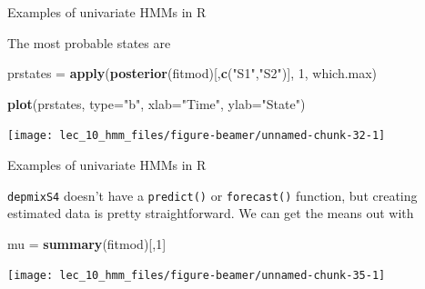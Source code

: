 \documentclass[
  ignorenonframetext,
]{beamer}
\newenvironment{Shaded}{\begin{snugshade}}{\end{snugshade}}
\newcommand{\DataTypeTok}[1]{\textcolor[rgb]{0.13,0.29,0.53}{#1}}
\newcommand{\DecValTok}[1]{\textcolor[rgb]{0.00,0.00,0.81}{#1}}
\newcommand{\KeywordTok}[1]{\textcolor[rgb]{0.13,0.29,0.53}{\textbf{#1}}}
\newcommand{\NormalTok}[1]{#1}
\newcommand{\OperatorTok}[1]{\textcolor[rgb]{0.81,0.36,0.00}{\textbf{#1}}}
\newcommand{\StringTok}[1]{\textcolor[rgb]{0.31,0.60,0.02}{#1}}
\begin{document}
\begin{frame}[fragile]{Examples of univariate HMMs in R}
\protect\hypertarget{examples-of-univariate-hmms-in-r-19}{}

The most probable states are

\begin{Shaded}
\begin{Highlighting}[]
\NormalTok{prstates =}\StringTok{ }\KeywordTok{apply}\NormalTok{(}\KeywordTok{posterior}\NormalTok{(fitmod)[,}\KeywordTok{c}\NormalTok{(}\StringTok{"S1"}\NormalTok{,}\StringTok{"S2"}\NormalTok{)], }
  \DecValTok{1}\NormalTok{, which.max)}
\end{Highlighting}
\end{Shaded}

\begin{Shaded}
\begin{Highlighting}[]
\KeywordTok{plot}\NormalTok{(prstates, }\DataTypeTok{type=}\StringTok{"b"}\NormalTok{, }\DataTypeTok{xlab=}\StringTok{"Time"}\NormalTok{, }\DataTypeTok{ylab=}\StringTok{"State"}\NormalTok{)}
\end{Highlighting}
\end{Shaded}

\begin{center}\texttt{[image: lec\_10\_hmm\_files/figure-beamer/unnamed-chunk-32-1]} \end{center}

\end{frame}

\begin{frame}[fragile]{Examples of univariate HMMs in R}
\protect\hypertarget{examples-of-univariate-hmms-in-r-20}{}

\texttt{depmixS4} doesn't have a \texttt{predict()} or
\texttt{forecast()} function, but creating estimated data is pretty
straightforward. We can get the means out with

\begin{Shaded}
\begin{Highlighting}[]
\NormalTok{mu =}\StringTok{ }\KeywordTok{summary}\NormalTok{(fitmod)[,}\DecValTok{1}\NormalTok{]}
\end{Highlighting}
\end{Shaded}

\begin{Shaded}
\end{Shaded}

\begin{center}\texttt{[image: lec\_10\_hmm\_files/figure-beamer/unnamed-chunk-35-1]} \end{center}

\end{frame}
\end{document}
